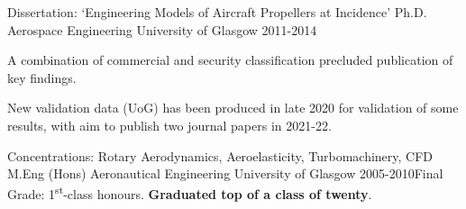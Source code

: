 
\vspace{.25cm}
\begin{cventries}


\cventry
	{Dissertation: `Engineering Models of Aircraft Propellers at Incidence'} %
	{Ph.D. Aerospace Engineering} %
	{University of Glasgow} %
	{2011-2014} %
	{\begin{cvitems}
	    	\item A combination of commercial and security classification precluded publication of key findings.
	    	\item New validation data (UoG) has been produced in late 2020 for validation of some results, with aim to publish two journal papers in 2021-22.
	  	\end{cvitems}
	}

\cventry
{Concentrations: Rotary Aerodynamics, Aeroelasticity, Turbomachinery, CFD}
{M.Eng (Hons) Aeronautical Engineering}
{University of Glasgow}
{2005-2010}{
{Final Grade: 1\textsuperscript{st}-class honours. \textbf{Graduated top of a class of twenty}.}}


\end{cventries}

